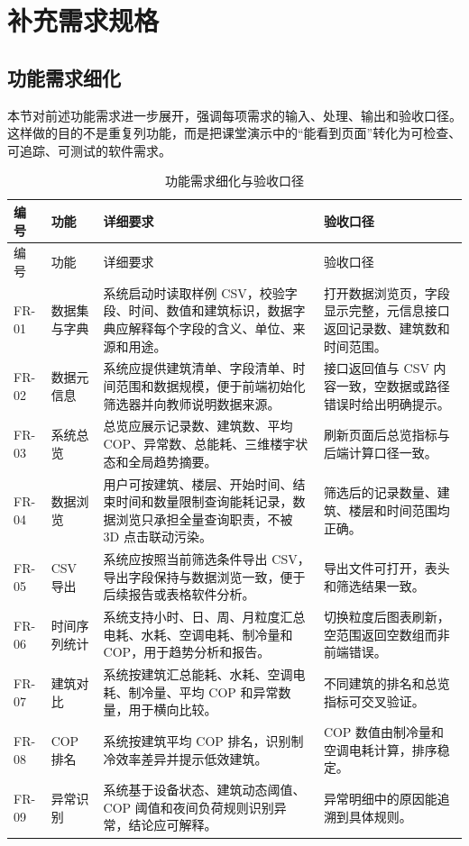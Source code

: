 \documentclass[12pt,a4paper]{ctexart}
\begin{document}
\clearpage
\section{补充需求规格}
\subsection{功能需求细化}
本节对前述功能需求进一步展开，强调每项需求的输入、处理、输出和验收口径。这样做的目的不是重复列功能，而是把课堂演示中的“能看到页面”转化为可检查、可追踪、可测试的软件需求。
\begin{longtable}{L{1.7cm}L{2.8cm}L{6.2cm}L{4.5cm}}
\caption{功能需求细化与验收口径}\\
\toprule
编号 & 功能 & 详细要求 & 验收口径 \\
\midrule
\endfirsthead
\toprule
编号 & 功能 & 详细要求 & 验收口径 \\
\midrule
\endhead
FR-01 & 数据集与字典 & 系统启动时读取样例 CSV，校验字段、时间、数值和建筑标识，数据字典应解释每个字段的含义、单位、来源和用途。 & 打开数据浏览页，字段显示完整，元信息接口返回记录数、建筑数和时间范围。 \\
FR-02 & 数据元信息 & 系统应提供建筑清单、字段清单、时间范围和数据规模，便于前端初始化筛选器并向教师说明数据来源。 & 接口返回值与 CSV 内容一致，空数据或路径错误时给出明确提示。 \\
FR-03 & 系统总览 & 总览应展示记录数、建筑数、平均 COP、异常数、总能耗、三维楼宇状态和全局趋势摘要。 & 刷新页面后总览指标与后端计算口径一致。 \\
FR-04 & 数据浏览 & 用户可按建筑、楼层、开始时间、结束时间和数量限制查询能耗记录，数据浏览只承担全量查询职责，不被 3D 点击联动污染。 & 筛选后的记录数量、建筑、楼层和时间范围均正确。 \\
FR-05 & CSV 导出 & 系统应按照当前筛选条件导出 CSV，导出字段保持与数据浏览一致，便于后续报告或表格软件分析。 & 导出文件可打开，表头和筛选结果一致。 \\
FR-06 & 时间序列统计 & 系统支持小时、日、周、月粒度汇总电耗、水耗、空调电耗、制冷量和 COP，用于趋势分析和报告。 & 切换粒度后图表刷新，空范围返回空数组而非前端错误。 \\
FR-07 & 建筑对比 & 系统按建筑汇总能耗、水耗、空调电耗、制冷量、平均 COP 和异常数量，用于横向比较。 & 不同建筑的排名和总览指标可交叉验证。 \\
FR-08 & COP 排名 & 系统按建筑平均 COP 排名，识别制冷效率差异并提示低效建筑。 & COP 数值由制冷量和空调电耗计算，排序稳定。 \\
FR-09 & 异常识别 & 系统基于设备状态、建筑动态阈值、COP 阈值和夜间负荷规则识别异常，结论应可解释。 & 异常明细中的原因能追溯到具体规则。 \\

\end{longtable}
\end{document}
